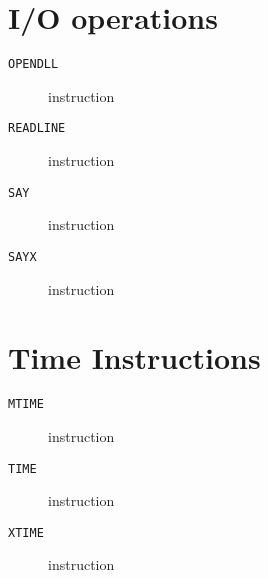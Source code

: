 \section{I/O operations}
\begin{description}
\item[\texttt{OPENDLL}] instruction\\

\end{description}
\clearpage
\begin{description}
\item[\texttt{READLINE}] instruction\\

\end{description}
\clearpage
\begin{description}
\item[\texttt{SAY}] instruction\\

\end{description}
\clearpage
\begin{description}
\item[\texttt{SAYX}] instruction\\

\end{description}
\clearpage
\section{Time Instructions}
\begin{description}
\item[\texttt{MTIME}] instruction\\

\end{description}
\clearpage
\begin{description}
\item[\texttt{TIME}] instruction\\

\end{description}
\clearpage
\begin{description}
\item[\texttt{XTIME}] instruction\\

\end{description}
\clearpage
